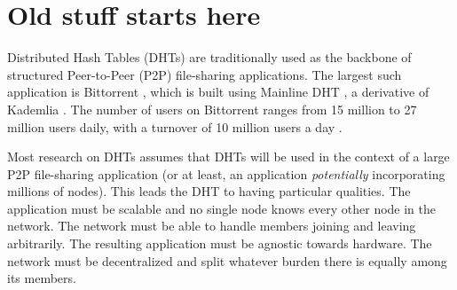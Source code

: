 \section{Old stuff starts here}



Distributed Hash Tables (DHTs) are traditionally used as the backbone of structured Peer-to-Peer (P2P) file-sharing applications.
The largest such application is Bittorrent \cite{bittorrent}, which is built using Mainline DHT \cite{mainline},  a  derivative of Kademlia \cite{kademlia}.
The number of users on Bittorrent ranges from 15 million to 27 million users daily, with a turnover of 10 million users a day \cite{mainlineMeasure}.

Most research on DHTs assumes that DHTs will be used in the context of a large P2P file-sharing application (or at least, an application \textit{potentially} incorporating millions of nodes).
This leads the DHT to having particular qualities.
The application must be scalable and no single node knows every other node in the network.
The network must be able to handle members joining and leaving arbitrarily.
The resulting application must be agnostic towards hardware.
The network must be decentralized and split whatever burden there is equally among its members.








